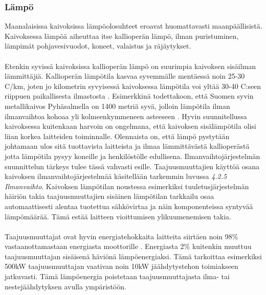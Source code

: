 \documentclass[finnish,12pt,a4paper,pdftex,elec,utf8]{aaltothesis}
\begin{document}
\subsubsection{Lämpö}
Maanalaisissa kaivoksissa lämpöolosuhteet eroavat huomattavasti maanpäällisistä. Kaivoksessa lämpöä aiheuttaa itse kallioperän lämpö, ilman puristuminen, lämpimät pohjavesivuodot, koneet, valaistus ja räjäytykset\cite[s.305]{Hakapää}. 
\\\\
Etenkin syvissä kaivoksissa kallioperän lämpö on suurimpia kaivoksen sisäilman lämmittäjiä. Kallioperän lämpötila kasvaa syvemmälle mentäessä noin 25-30 \textdegree C/km, joten jo kilometrin syvyisessä kaivoksessa lämpötila voi yltää 30-40 \textdegree C:seen riippuen paikallisesta ilmastosta \cite[s. 62]{maanlampo}. %
Esimerkkinä todettakoon, että Suomen syvin metallikaivos Pyhäsalmella on 1400 metriä syvä, jolloin lämpötila ilman ilmanvaihtoa kohoaa yli kolmeenkymmeneen asteeseen \cite{Pyhäsalmi}. Hyvin suunnitellussa kaivoksessa kuitenkaan harvoin on ongelmana, että kaivoksen sisälämpötila olisi liian korkea laitteiden toiminnalle. Olennaista on, että lämpö pystytään johtamaan ulos sitä tuottavista laitteista ja ilmaa lämmittävästä kallioperästä jotta lämpötila pysyy koneille ja henkilöstölle edullisena. Ilmanvaihtojärjestelmän suunnittelun tärkeys tulee tässä vahvasti esille. Taajuusmuuttajien käyttöä osana kaivoksen ilmanvaihtojärjestelmää käsitellään tarkemmin luvussa \textit{4.2.5 Ilmanvaihto}. Kaivoksen lämpötilan noustessa esimerkiksi tuuletusjärjestelmän häiriön takia taajuusmuuttajien sisäinen lämpötilan tarkkailu osaa automaattisesti alentaa tuotettua sähkövirtaa ja näin komponenteissa syntyvää lämpömäärää. Tämä estää laitteen vioittumisen ylikuumenemisen takia.
\\\\
Taajuusmuuttajat ovat hyvin energiatehokkaita laitteita siirtäen noin 98\% vastaanottamastaan energiasta moottorille \cite{ABBinmining}. Energiasta 2\% kuitenkin muuttuu taajuusmuuttajan sisäisenä häviönä lämpöenergiaksi. Tämä tarkoittaa esimerkiksi 500kW taajuusmuuttajan vaativan noin 10kW jäähdytystehon toimiakseen jatkuvasti. Tämä lämpöenergia poistetaan taajuusmuuttajasta ilma- tai nestejäähdytyksen avulla ympäristöön.
 
\end{document}
